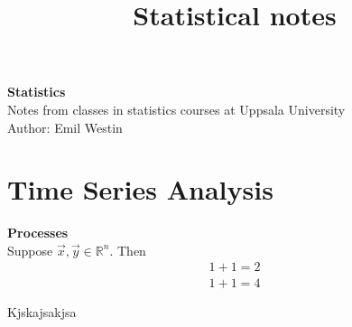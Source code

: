 \documentclass[11pt]{article}
\begin{document}
\title{Statistical notes}

\thispagestyle{empty}

\begin{center}
{\LARGE \bf Statistics}\\
Notes from classes in statistics courses at Uppsala University \\
Author: Emil Westin
\end{center}

\section{Time Series Analysis}

\textbf{Processes}\\

Suppose $\vec{x},\vec{y} \in \mathbb{R}^n$. Then 
\begin{align}
1+1 = 2 \label{MA1} \\
1+1 = 4 \label{MA2} 
\end{align}

Kjskajsakjsa
\end{document}
